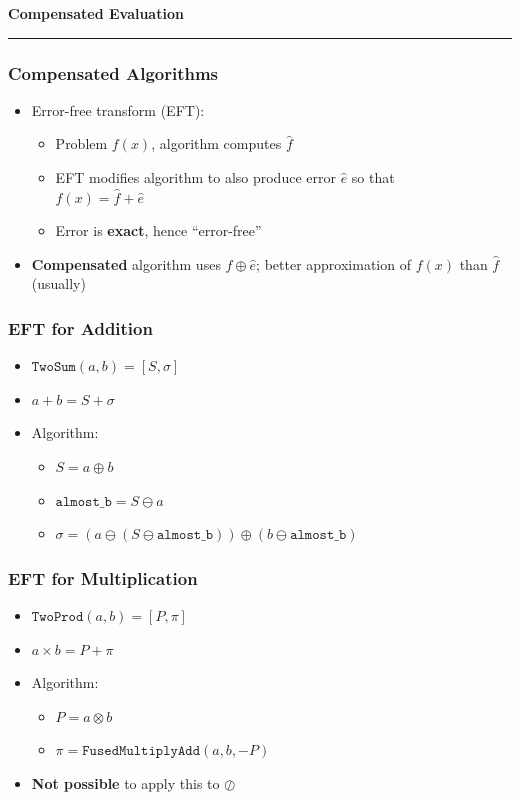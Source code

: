 \documentclass{beamer}
\begin{document}

\begin{frame}
\centering
{\Large \bf Compensated Evaluation}
\rule{0.82\textwidth}{1pt}
\end{frame}

\begin{frame}
\frametitle{Compensated Algorithms}
\begin{itemize}
\item Error-free transform (EFT):
\begin{itemize}
\pause
\item Problem \(f(x)\), algorithm computes \(\widehat{f}\)
\pause
\item EFT modifies algorithm to also produce error \(\widehat{e}\)
  so that \\ \(f(x) = \widehat{f} + \widehat{e}\)
\pause
\item Error is \textbf{exact}, hence ``error-free''
\end{itemize}
\pause
\item \textbf{Compensated} algorithm uses \(\widehat{f} \oplus \widehat{e}\);
  better approximation of \(f(x)\) than \(\widehat{f}\) (usually)
\end{itemize}
\end{frame}

\begin{frame}
\frametitle{EFT for Addition}
\begin{itemize}
\item \(\mathtt{TwoSum}(a, b) = \left[S, \sigma\right]\)
\pause
\item \(a + b = S + \sigma\)
\pause
\item Algorithm:
\begin{itemize}
\pause
\item \(S = a \oplus b\)
\pause
\item \(\mathtt{almost\_b} = S \ominus a\)
\pause
\item \(\sigma = (a \ominus (S \ominus \mathtt{almost\_b}))
  \oplus (b \ominus \mathtt{almost\_b})\)
\end{itemize}
\end{itemize}
\end{frame}

\begin{frame}
\frametitle{EFT for Multiplication}
\begin{itemize}
\item \(\mathtt{TwoProd}(a, b) = \left[P, \pi\right]\)
\pause
\item \(a \times b = P + \pi\)
\pause
\item Algorithm:
\begin{itemize}
\pause
\item \(P = a \otimes b\)
\pause
\item \(\pi = \mathtt{FusedMultiplyAdd}(a, b, -P)\)
\end{itemize}
\pause
\item \textbf{Not possible} to apply this to \(\oslash\)
\end{itemize}
\end{frame}
\end{document}
